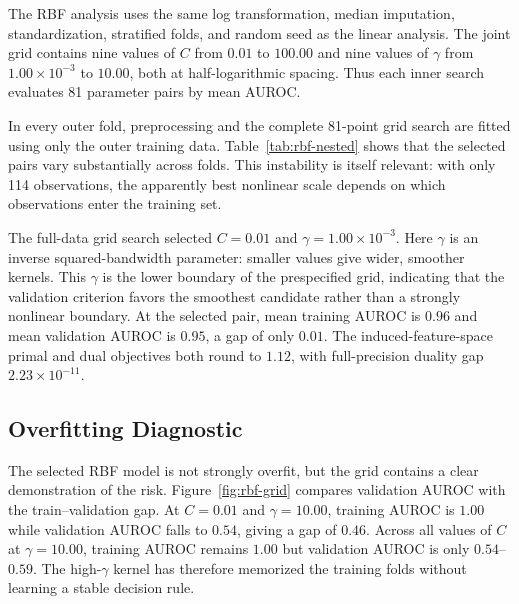 \documentclass[11pt,a4paper]{article}
\numberwithin{equation}{section} %
\begin{document}
The RBF analysis uses the same log transformation, median imputation,
standardization, stratified folds, and random seed as the linear analysis. The
joint grid contains nine values of $C$ from $0.01$ to $100.00$ and nine values
of $\gamma$ from $1.00\times10^{-3}$ to $10.00$, both at half-logarithmic
spacing. Thus each inner search evaluates 81 parameter pairs by mean AUROC.

In every outer fold, preprocessing and the complete 81-point grid search are
fitted using only the outer training data. Table~\ref{tab:rbf-nested} shows
that the selected pairs vary substantially across folds. This instability is
itself relevant: with only 114 observations, the apparently best nonlinear
scale depends on which observations enter the training set.

\begin{table}[H]
\centering
\caption{Nested cross-validation for joint RBF tuning. AUROC values and parameter displays use two decimals or two-decimal scientific notation.}
\label{tab:rbf-nested}
\small

\end{table}

The full-data grid search selected $C=0.01$ and
$\gamma=1.00\times10^{-3}$. Here $\gamma$ is an inverse squared-bandwidth
parameter: smaller values give wider, smoother kernels. This $\gamma$ is the lower boundary of the
prespecified grid, indicating that the validation criterion favors the
smoothest candidate rather than a strongly nonlinear boundary. At the
selected pair, mean training AUROC is $0.96$ and mean validation AUROC is
$0.95$, a gap of only $0.01$. The induced-feature-space primal and dual
objectives both round to $1.12$, with full-precision duality gap
$2.23\times10^{-11}$.

\begin{table}[H]
\centering
\caption{Full-data RBF model-selection and optimization audit.}
\label{tab:rbf-summary}

\end{table}

\subsection{Overfitting Diagnostic}

The selected RBF model is not strongly overfit, but the grid contains a clear
demonstration of the risk. Figure~\ref{fig:rbf-grid} compares validation AUROC
with the train--validation gap. At $C=0.01$ and $\gamma=10.00$, training AUROC
is $1.00$ while validation AUROC falls to $0.54$, giving a gap of $0.46$.
Across all values of $C$ at $\gamma=10.00$, training AUROC remains $1.00$ but
validation AUROC is only $0.54$--$0.59$. The high-$\gamma$ kernel has therefore
memorized the training folds without learning a stable decision rule.
\end{document}
